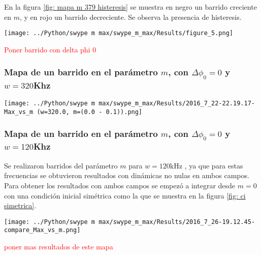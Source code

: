 			En la figura \ref{fig: mapa m 379 histeresis} se muestra en negro un barrido creciente en $m$, y en rojo un barrido decreciente.
			Se observa la presencia de histeresis.
			
			\begin{center}
				\texttt{[image: ../Python/swype m max/swype\_m\_max/Results/figure\_5.png]}
				\label{fig: mapa m 379 histeresis}
			\end{center}
					
			\textcolor{red}{Poner barrido con delta phi 0 }
			
				\subsubsection{Mapa de un barrido en el parámetro $m$, con $\Delta \phi_0 = 0 $ y $w=320$Khz}
				
				\begin{center}
					\texttt{[image: ../Python/swype m max/swype\_m\_max/Results/2016\_7\_22-22.19.17-Max\_vs\_m (w=320.0, m=(0.0 - 0.1)).png]}
					\label{fig: mapa m 320}
				\end{center}		

		\subsubsection{Mapa de un barrido en el parámetro $m$, con $\Delta \phi_0 = 0 $ y $w=120$Khz}
		
		Se realizaron barridos del parámetro $m$ para $w=120$kHz , ya que para estas frecuencias se obtuvieron resultados con dinámicas no nulas en ambos campos.
		Para obtener los resultados con ambos campos se empezó a integrar desde  $m=0$ con una condición inicial simétrica como la que se muestra en la figura \ref{fig: ci simetrica}. 
		
			\begin{center}
				\texttt{[image: ../Python/swype m max/swype\_m\_max/Results/2016\_7\_26-19.12.45-compare\_Max\_vs\_m.png]}
				\label{fig: mapa m 120}
			\end{center}		
		\textcolor{red}{poner mas resultados de este mapa}
		
